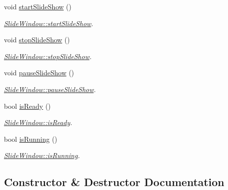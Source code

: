 \begin{DoxyCompactItemize}
\mbox{\label{classSlideWindow_a9d3d44873c65713a074ba695b47980bc}} 
void \mbox{\hyperlink{classSlideWindow_a9d3d44873c65713a074ba695b47980bc}{start\+Slide\+Show}} ()
\begin{DoxyCompactList}\small\item\em \mbox{\hyperlink{classSlideWindow_a9d3d44873c65713a074ba695b47980bc}{Slide\+Window\+::start\+Slide\+Show}}. \end{DoxyCompactList}\item 
\mbox{\label{classSlideWindow_a89de9d9f9a95ce0a35f74fe4753271c4}} 
void \mbox{\hyperlink{classSlideWindow_a89de9d9f9a95ce0a35f74fe4753271c4}{stop\+Slide\+Show}} ()
\begin{DoxyCompactList}\small\item\em \mbox{\hyperlink{classSlideWindow_a89de9d9f9a95ce0a35f74fe4753271c4}{Slide\+Window\+::stop\+Slide\+Show}}. \end{DoxyCompactList}\item 
\mbox{\label{classSlideWindow_afba2bd4fa49e7f3314ed1c8f82eaf381}} 
void \mbox{\hyperlink{classSlideWindow_afba2bd4fa49e7f3314ed1c8f82eaf381}{pause\+Slide\+Show}} ()
\begin{DoxyCompactList}\small\item\em \mbox{\hyperlink{classSlideWindow_afba2bd4fa49e7f3314ed1c8f82eaf381}{Slide\+Window\+::pause\+Slide\+Show}}. \end{DoxyCompactList}\item 
bool \mbox{\hyperlink{classSlideWindow_aeb8eb94e4d5e470ddd23129a337defed}{is\+Ready}} ()
\begin{DoxyCompactList}\small\item\em \mbox{\hyperlink{classSlideWindow_aeb8eb94e4d5e470ddd23129a337defed}{Slide\+Window\+::is\+Ready}}. \end{DoxyCompactList}\item 
bool \mbox{\hyperlink{classSlideWindow_aabcc67b2a5443bc5bfe27cbc348fc094}{is\+Running}} ()
\begin{DoxyCompactList}\small\item\em \mbox{\hyperlink{classSlideWindow_aabcc67b2a5443bc5bfe27cbc348fc094}{Slide\+Window\+::is\+Running}}. \end{DoxyCompactList}\end{DoxyCompactItemize}


\subsection{Constructor \& Destructor Documentation}
\mbox{\label{classSlideWindow_a069924b6d71578c14bbdedad2fa2497f}} 

